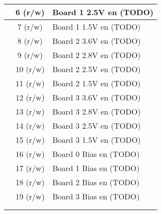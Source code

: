 \documentclass[landscape,margin=3pt,pstricks]{standalone}
\begin{document}
\begin{tabular}{|c|c|*{32}{c|}}
 & 6 (r/w) &  \multicolumn{32}{|l|}{Board 1 2.5V en (TODO)} \\ \hline
 & 7 (r/w) &  \multicolumn{32}{|l|}{Board 1 1.5V en (TODO)} \\ \hline
 & 8 (r/w) &  \multicolumn{32}{|l|}{Board 2 3.6V en (TODO)} \\ \hline
 & 9 (r/w) &  \multicolumn{32}{|l|}{Board 2 2.8V en (TODO)} \\ \hline
 & 10 (r/w) &  \multicolumn{32}{|l|}{Board 2 2.5V en (TODO)} \\ \hline
 & 11 (r/w) &  \multicolumn{32}{|l|}{Board 2 1.5V en (TODO)} \\ \hline
 & 12 (r/w) &  \multicolumn{32}{|l|}{Board 3 3.6V en (TODO)} \\ \hline
 & 13 (r/w) &  \multicolumn{32}{|l|}{Board 3 2.8V en (TODO)} \\ \hline
 & 14 (r/w) &  \multicolumn{32}{|l|}{Board 3 2.5V en (TODO)} \\ \hline
 & 15 (r/w) &  \multicolumn{32}{|l|}{Board 3 1.5V en (TODO)} \\ \hline
 & 16 (r/w) &  \multicolumn{32}{|l|}{Board 0 Bias en (TODO)} \\ \hline
 & 17 (r/w) &  \multicolumn{32}{|l|}{Board 1 Bias en (TODO)} \\ \hline
 & 18 (r/w) &  \multicolumn{32}{|l|}{Board 2 Bias en (TODO)} \\ \hline
 & 19 (r/w) &  \multicolumn{32}{|l|}{Board 3 Bias en (TODO)} \\ \hline
 &  &  \multicolumn{32}{|l|}{} \\ \hline
 &  &  \multicolumn{32}{|l|}{} \\ \hline
  \hline
\end{tabular}
\end{document}
